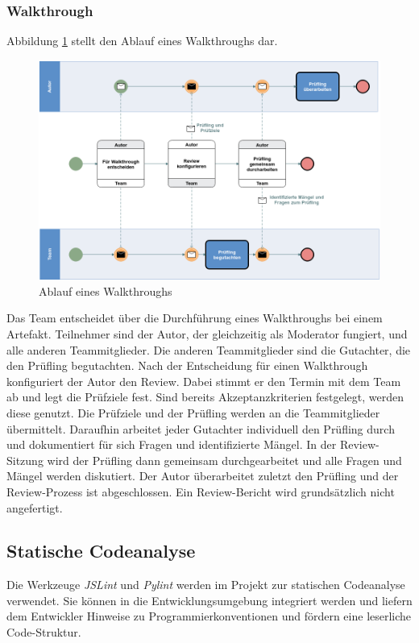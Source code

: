 \documentclass[a4paper,11pt,listof=numbered,glossary=totoc,parskip=half,toc=bib]{scrreprt}
\begin{document}
\subsubsection{Walkthrough}
Abbildung \ref{fig:walkthrough} stellt den Ablauf eines Walkthroughs dar.
	\begin{figure}
		\centering
		\includegraphics[width=\textwidth]{walkthrough.png}
		\caption{Ablauf eines Walkthroughs}
		\label{fig:walkthrough}
	\end{figure}
Das Team entscheidet über die Durchführung eines Walkthroughs bei einem Artefakt. Teilnehmer sind der Autor, der gleichzeitig als Moderator fungiert, und alle anderen Teammitglieder. Die anderen Teammitglieder sind die Gutachter, die den Prüfling begutachten. Nach der Entscheidung für einen Walkthrough konfiguriert der Autor den Review. Dabei stimmt er den Termin mit dem Team ab und legt die Prüfziele fest. Sind bereits Akzeptanzkriterien festgelegt, werden diese genutzt. Die Prüfziele und der Prüfling werden an die Teammitglieder übermittelt. Daraufhin arbeitet jeder Gutachter individuell den Prüfling durch und dokumentiert für sich Fragen und identifizierte Mängel. In der Review-Sitzung wird der Prüfling dann gemeinsam durchgearbeitet und alle Fragen und Mängel werden diskutiert. Der Autor überarbeitet zuletzt den Prüfling und der Review-Prozess ist abgeschlossen. Ein Review-Bericht wird grundsätzlich nicht angefertigt.

\subsection{Statische Codeanalyse}
Die Werkzeuge \textit{JSLint} und \textit{Pylint} werden im Projekt zur statischen Codeanalyse verwendet. Sie können in die Entwicklungsumgebung integriert werden und liefern dem Entwickler Hinweise zu Programmierkonventionen und fördern eine leserliche Code-Struktur.
	
\end{document}
